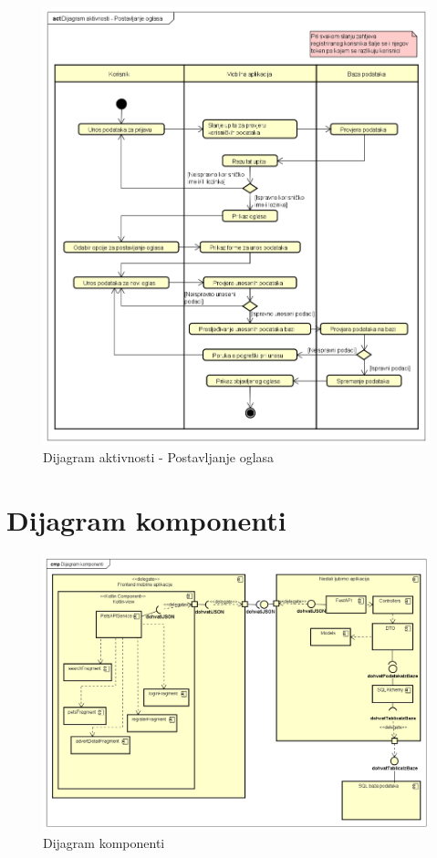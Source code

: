 			\begin{figure}[H]
				\includegraphics[scale=0.6]{dijagrami/dijagramAktivnosti/dAktivnosti.PNG} %
				\centering
				\caption{Dijagram aktivnosti - Postavljanje oglasa}
				\label{fig:dAktivnosti}
			\end{figure}
			
			\eject
		\section{Dijagram komponenti}
		
			\begin{figure}[H]
				\includegraphics[scale=0.48]{dijagrami/dijagramKomponenti/dKomponenti.PNG} %
				\centering
				\caption{Dijagram komponenti}
				\label{fig:dKomponenti}
			\end{figure}
